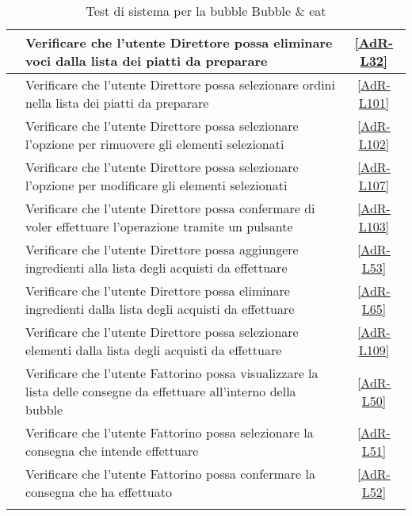 \begin{longtable}{|c|P{9cm}|c|}
	\hline {} & Verificare che l'utente Direttore possa eliminare voci dalla lista dei piatti da preparare & \ref{AdR-L32} \\
	\hline {} & Verificare che l'utente Direttore possa selezionare ordini nella lista dei piatti da preparare & \ref{AdR-L101} \\
	\hline {} & Verificare che l'utente Direttore possa selezionare l'opzione per rimuovere gli elementi selezionati & \ref{AdR-L102} \\
	\hline {} & Verificare che l'utente Direttore possa selezionare l'opzione per modificare gli elementi selezionati & \ref{AdR-L107} \\
	\hline {} & Verificare che l'utente Direttore possa confermare di voler effettuare l'operazione tramite un pulsante & \ref{AdR-L103} \\
	\hline {} & Verificare che l'utente Direttore possa aggiungere ingredienti alla lista degli acquisti da effettuare & \ref{AdR-L53}\\
	\hline {} & Verificare che l'utente Direttore possa eliminare ingredienti dalla lista degli acquisti da effettuare & \ref{AdR-L65} \\
	\hline {} & Verificare che l'utente Direttore possa selezionare elementi dalla lista degli acquisti da effettuare & \ref{AdR-L109} \\
	\hline {} & Verificare che l'utente Fattorino possa visualizzare la lista delle consegne da effettuare all’interno della bubble & \ref{AdR-L50}  \\
	\hline {} & Verificare che l'utente Fattorino possa selezionare la consegna che intende effettuare & \ref{AdR-L51} \\
	\hline {} & Verificare che l'utente Fattorino possa confermare la consegna che ha effettuato & \ref{AdR-L52} \\
	\hline
	\caption{Test di sistema per la bubble Bubble \& eat}
\end{longtable}
